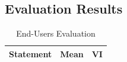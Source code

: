 
\begin{appendices}

	\begin{centerappendixtitle}
		\chapter{Evaluation Results}
		\pagebreak
		
		\begin{spacing}{1.3}
		\begin{longtable}{p{12cm}cc}	
		\caption{End-Users Evaluation} \\
		\hline
		\textbf{Statement} & \textbf{Mean} & \textbf{VI} \\
		\hline
		\endfirsthead
		

\end{longtable}
\end{spacing}
\end{centerappendixtitle}
\end{appendices}
